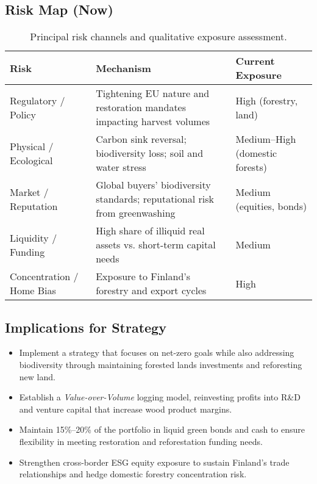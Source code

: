 \subsection*{Risk Map (Now)}
\begin{table}[h!]
\centering
\begin{tabular}{p{3.3cm} p{6.6cm} p{3.3cm}}
\toprule
\textbf{Risk} & \textbf{Mechanism} & \textbf{Current Exposure} \\
\midrule
Regulatory / Policy & Tightening EU nature and restoration mandates impacting harvest volumes & High (forestry, land) \\
Physical / Ecological & Carbon sink reversal; biodiversity loss; soil and water stress & Medium–High (domestic forests) \\
Market / Reputation & Global buyers’ biodiversity standards; reputational risk from greenwashing & Medium (equities, bonds) \\
Liquidity / Funding & High share of illiquid real assets vs. short-term capital needs & Medium \\
Concentration / Home Bias & Exposure to Finland’s forestry and export cycles & High \\
\bottomrule
\end{tabular}
\caption{Principal risk channels and qualitative exposure assessment.}
\end{table}


\subsection*{Implications for Strategy }
\begin{itemize}[leftmargin=*, itemsep=2pt]
    \item Implement a strategy that focuses on net-zero goals while also addressing biodiversity through maintaining forested lands investments and reforesting new land.
    \item Establish a \emph{Value-over-Volume} logging model, reinvesting profits into R\&D and venture capital that increase wood product margins.
    \item Maintain 15\%–20\% of the portfolio in liquid green bonds and cash to ensure flexibility in meeting restoration and reforestation funding needs.
    \item Strengthen cross-border ESG equity exposure to sustain Finland’s trade relationships and hedge domestic forestry concentration risk.
    
\end{itemize}
